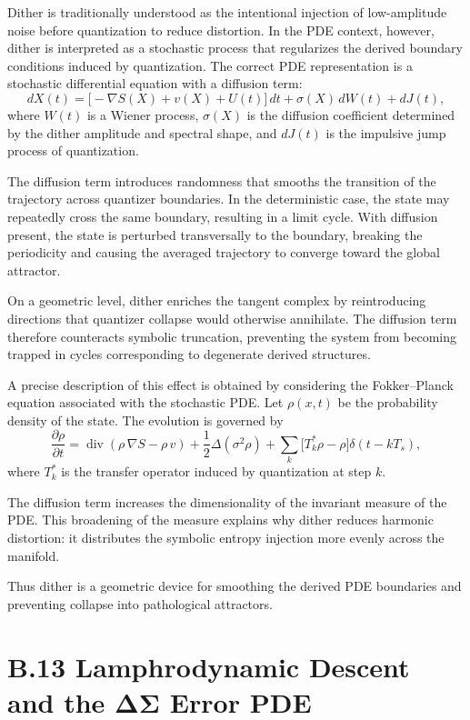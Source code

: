 Dither is traditionally understood as the intentional injection of low-amplitude noise before quantization to reduce distortion. In the PDE context, however, dither is interpreted as a stochastic process that regularizes the derived boundary conditions induced by quantization. The correct PDE representation is a stochastic differential equation with a diffusion term:
\[
dX(t) 
= \bigl[-\nabla S(X) + v(X) + U(t)\bigr]\,dt
+ \sigma(X)\,dW(t)
+ dJ(t),
\]
where \(W(t)\) is a Wiener process, \(\sigma(X)\) is the diffusion coefficient determined by the dither amplitude and spectral shape, and \(dJ(t)\) is the impulsive jump process of quantization.

The diffusion term introduces randomness that smooths the transition of the trajectory across quantizer boundaries. In the deterministic case, the state may repeatedly cross the same boundary, resulting in a limit cycle. With diffusion present, the state is perturbed transversally to the boundary, breaking the periodicity and causing the averaged trajectory to converge toward the global attractor.

On a geometric level, dither enriches the tangent complex by reintroducing directions that quantizer collapse would otherwise annihilate. The diffusion term therefore counteracts symbolic truncation, preventing the system from becoming trapped in cycles corresponding to degenerate derived structures.

A precise description of this effect is obtained by considering the Fokker–Planck equation associated with the stochastic PDE. Let \(\rho(x,t)\) be the probability density of the state. The evolution is governed by
\[
\frac{\partial \rho}{\partial t}
= \operatorname{div}\!\left(
\rho\,\nabla S - \rho\,v
\right)
+ \frac{1}{2}\Delta(\sigma^{2}\rho)
+ \sum_{k} \bigl[T_{k}^{\ast}\rho - \rho\bigr]\delta(t-kT_{s}),
\]
where \(T_{k}^{\ast}\) is the transfer operator induced by quantization at step \(k\).

The diffusion term increases the dimensionality of the invariant measure of the PDE. This broadening of the measure explains why dither reduces harmonic distortion: it distributes the symbolic entropy injection more evenly across the manifold.

Thus dither is a geometric device for smoothing the derived PDE boundaries and preventing collapse into pathological attractors.

\section{B.13 Lamphrodynamic Descent and the ΔΣ Error PDE}

